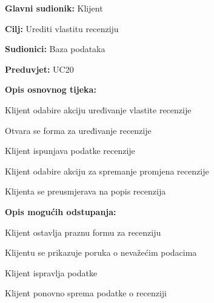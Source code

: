 \noindent {}
\begin{packed_item}
	
	\item \textbf{Glavni sudionik:} Klijent
	\item  \textbf{Cilj:} Urediti vlastitu recenziju
	\item  \textbf{Sudionici:} Baza podataka
	\item  \textbf{Preduvjet:} UC20
	\item  \textbf{Opis osnovnog tijeka:}
	
	\item[] \begin{packed_enum}
		
		\item Klijent odabire akciju uređivanje vlastite recenzije
		\item Otvara se forma za uređivanje recenzije
		\item Klijent ispunjava podatke recenzije
		\item Klijent odabire akciju za spremanje promjena recenzije
		\item Klijenta se preusmjerava na popis recenzija
		
		\end{packed_enum}
		
	\item  \textbf{Opis mogućih odstupanja:}
	\item[] \begin{packed_item}
		
		\item[3.a] Klijent ostavlja praznu formu za recenziju
		\item[] \begin{packed_enum}
			
			\item Klijentu se prikazuje poruka o nevažećim podacima
			\item Klijent ispravlja podatke
			\item Klijent ponovno sprema podatke o recenziji
			
		\end{packed_enum}
		\end{packed_item}
		
\end{packed_item}


